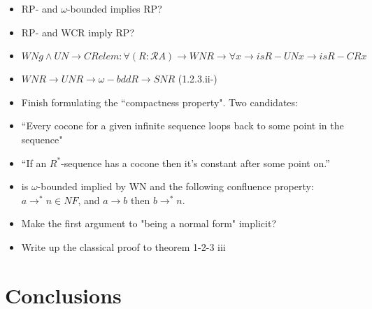 \documentclass{scrartcl}
\begin{document}
\begin{itemize}
     \item RP- and $\omega$-bounded implies RP?
     \item RP- and WCR imply RP?
     \item
     \[ WNg \land UN \to CRelem :
     \forall (R : \mathscr{R} A) \to WN R \to \forall x \to is R -UN x \to is R -CR x \]
     \item $WN R \to UN R \to \omega-bdd R \to SN R$ (1.2.3.ii-)
      \item Finish formulating the ``compactness property".  Two candidates:
       \item ``Every cocone for a given infinite sequence loops back to some point in the sequence"
       \item ``If an $R^*$-sequence has a cocone then it's constant after some point on.''
       \item is $\omega$-bounded implied by WN and the following confluence property:
       $a \to^* n \in NF$, and $a \to b$ then $b \to^* n $.
    \item  Make the first argument to "being a normal form" implicit?
    \item Write up the classical proof to theorem 1-2-3 iii
     

\end{itemize}
\section{Conclusions}
\end{document}
